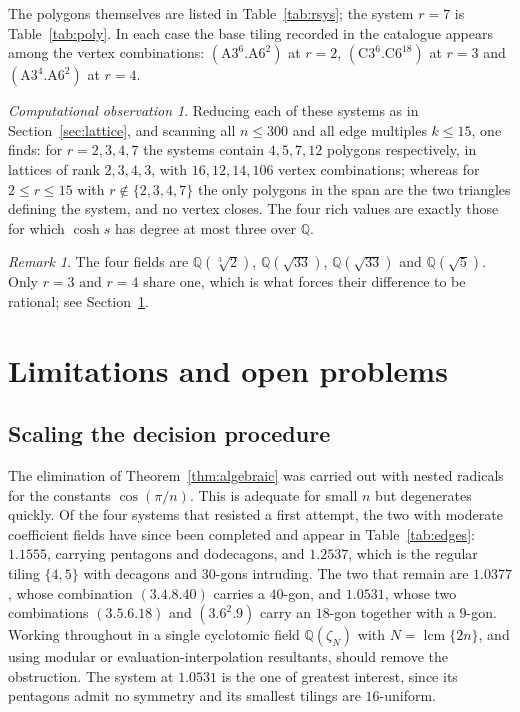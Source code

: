 \documentclass[11pt,a4paper]{article}
\theoremstyle{plain}
\theoremstyle{definition}
\theoremstyle{remark}
\newtheorem{remark}[theorem]{Remark}
\newtheorem{observation}[theorem]{Computational observation}
\newcommand{\QQ}{\mathbb{Q}}
\newcommand{\vc}[1]{(#1)}
\begin{document}
The polygons themselves are listed in Table~\ref{tab:rsys}; the system $r=7$ is
Table~\ref{tab:poly}. In each case the base tiling recorded in the catalogue
appears among the vertex combinations: $\vc{\mathrm{A}3^{6}.\mathrm{A}6^{2}}$ at
$r=2$, $\vc{\mathrm{C}3^{6}.\mathrm{C}6^{18}}$ at $r=3$ and
$\vc{\mathrm{A}3^{4}.\mathrm{A}6^{2}}$ at $r=4$.

\begin{observation}\label{obs:rich}
Reducing each of these systems as in Section~\ref{sec:lattice}, and scanning all
$n\le300$ and all edge multiples $k\le15$, one finds:
for $r=2,3,4,7$ the systems contain $4,5,7,12$ polygons respectively, in lattices
of rank $2,3,4,3$, with $16,12,14,106$ vertex combinations; whereas for
$2\le r\le15$ with $r\notin\{2,3,4,7\}$ the only polygons in the span are the two
triangles defining the system, and no vertex closes. The four rich values are
exactly those for which $\cosh s$ has degree at most three over $\QQ$.
\end{observation}

\begin{remark}
The four fields are $\QQ(\sqrt[3]{2})$, $\QQ(\sqrt{33})$, $\QQ(\sqrt{33})$ and
$\QQ(\sqrt5)$. Only $r=3$ and $r=4$ share one, which is what forces their
difference to be rational; see Section~\ref{sec:limits}.
\end{remark}

\section{Limitations and open problems}\label{sec:limits}

\subsection*{Scaling the decision procedure}
The elimination of Theorem~\ref{thm:algebraic} was carried out with nested
radicals for the constants $\cos(\pi/n)$. This is adequate for small $n$ but
degenerates quickly. Of the four systems that resisted a first attempt, the two
with moderate coefficient fields have since been completed and appear in
Table~\ref{tab:edges}: $1.1555$, carrying pentagons and dodecagons, and $1.2537$,
which is the regular tiling $\{4,5\}$ with decagons and $30$-gons intruding. The
two that remain are $1.0377$, whose combination $\vc{3.4.8.40}$ carries a
$40$-gon, and $1.0531$, whose two combinations $\vc{3.5.6.18}$ and
$\vc{3.6^{2}.9}$ carry an $18$-gon together with a $9$-gon. Working throughout in
a single cyclotomic field $\QQ(\zeta_N)$ with $N=\operatorname{lcm}\{2n\}$, and
using modular or evaluation-interpolation resultants, should remove the
obstruction. The system at $1.0531$ is the one of greatest interest, since its
pentagons admit no symmetry and its smallest tilings are $16$-uniform.
\end{document}
